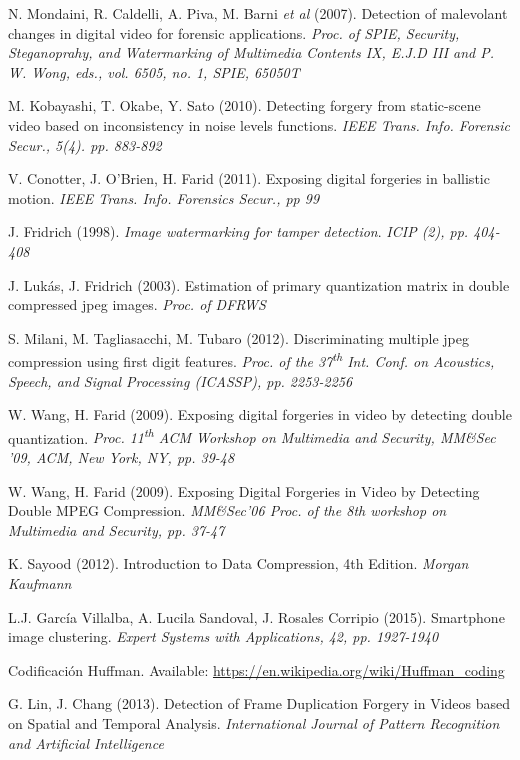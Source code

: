 \begin{thebibliography}{11}
N. Mondaini, R. Caldelli, A. Piva, M. Barni \textit{et al} (2007). Detection of malevolant changes in digital video for forensic applications. \textit{Proc. of SPIE, Security, Steganoprahy, and Watermarking of Multimedia Contents IX, E.J.D III and P. W. Wong, eds., vol. 6505, no. 1, SPIE, 65050T}

M. Kobayashi, T. Okabe, Y. Sato (2010). Detecting forgery from static-scene video based on inconsistency in noise levels functions. \textit{IEEE Trans. Info. Forensic Secur., 5(4). pp. 883-892}

V. Conotter, J. O'Brien, H. Farid (2011). Exposing digital forgeries in ballistic motion. \textit{IEEE Trans. Info. Forensics Secur., pp 99}

J. Fridrich (1998). \textit{Image watermarking for tamper detection}. \textit{ICIP (2), pp. 404-408}

J. Lukás, J. Fridrich (2003). Estimation of primary quantization matrix in double compressed jpeg images. \textit{Proc. of DFRWS}

S. Milani, M. Tagliasacchi, M. Tubaro (2012). Discriminating multiple jpeg compression using first digit features. \textit{Proc. of the 37\textsuperscript{th} Int. Conf. on Acoustics, Speech, and Signal Processing (ICASSP), pp. 2253-2256}

W. Wang, H. Farid (2009). Exposing digital forgeries in video by detecting double quantization. \textit{Proc. 11\textsuperscript{th} ACM Workshop on Multimedia and Security, MM\&Sec '09, ACM, New York, NY, pp. 39-48}

W. Wang, H. Farid (2009). Exposing Digital Forgeries in Video by Detecting Double MPEG Compression. \textit{MM\&Sec'06 Proc. of the 8th workshop on Multimedia and Security, pp. 37-47}

K. Sayood (2012). Introduction to Data Compression, 4th Edition. \textit{Morgan Kaufmann}

L.J. García Villalba, A. Lucila Sandoval, J. Rosales Corripio (2015). Smartphone image clustering. \textit{Expert Systems with Applications, 42, pp. 1927-1940}

Codificación Huffman. Available: \url{https://en.wikipedia.org/wiki/Huffman\_coding}

G. Lin, J. Chang (2013). Detection of Frame Duplication Forgery in Videos based on Spatial and Temporal Analysis. \textit{International Journal of Pattern Recognition and Artificial Intelligence}


\end{thebibliography}
